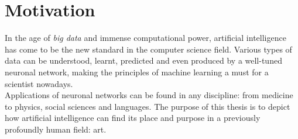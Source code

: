\chapter*{Motivation}

In the age of \textit{big data} and immense computational power, artificial intelligence has come to be the new standard in the computer science field. Various types of data can be understood, learnt, predicted and even produced by a well-tuned neuronal network, making the principles of machine learning a must for a scientist nowadays.\\


Applications of neuronal networks can be found in any discipline: from medicine to physics, social sciences and languages. The purpose of this thesis is to depict how artificial intelligence can find its place and purpose in a previously profoundly human field: art.
